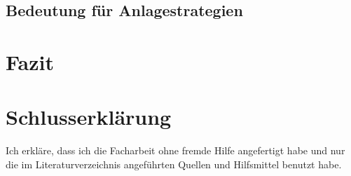 \documentclass[12pt, a4paper, titlepage]{report}
\begin{document}
        \section{Bedeutung für Anlagestrategien}

    \chapter{Fazit}

    \chapter{Schlusserklärung}
        Ich erkläre, dass ich die Facharbeit ohne fremde Hilfe angefertigt habe
        und nur die im Literaturverzeichnis angeführten Quellen und Hilfsmittel benutzt habe.

    
\end{document}
